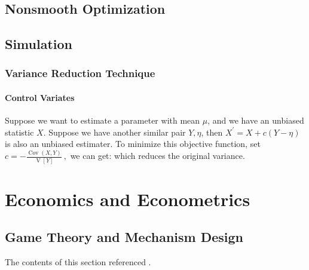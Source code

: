 \documentclass[12pt]{report}
\begin{document}
\clearpage
\section{Nonsmooth Optimization}

\clearpage
\section{Simulation}

\subsection{Variance Reduction Technique}

\subsubsection{Control Variates}
Suppose we want to estimate a parameter with mean $\mu$, and we have an unbiased statistic $X$. Suppose we have another similar pair $Y,\eta$,
then $X^{\prime}=X+c(Y-\eta)$ is also an unbiased estimater.
To minimize this objective function, set $c=-\frac{\operatorname{Cov}(X,Y)}{\operatorname{V}[Y]}\mathrm{~,}$ we can get:
which reduces the original variance.

\clearpage
\chapter{Economics and Econometrics}

\section{Game Theory and Mechanism Design}

The contents of this section referenced \cite{fudenberg1991game}.
\end{document}
